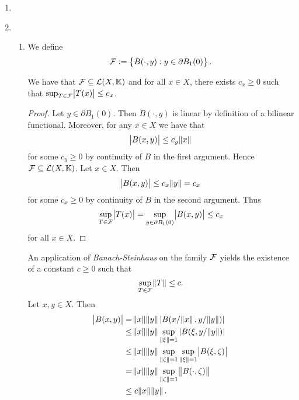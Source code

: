\begin{enumerate}[label = \textbf{Exercise \arabic*.},wide = 0pt, itemsep = 1.5ex]
	\item

	\item
		~
		\begin{enumerate}[label = \textbf{\alph*.},wide = 0pt, itemsep = 1.5ex]
			\item We define
				\begin{equation*}
					\Fcal := \cbr{B(\cdot,y) : y \in \partial B_1(0)}.
				\end{equation*}

				\begin{lemma}
					We have that $\mathcal{F} \subseteq \mathcal{L}(X,\mathbb{K})$ and for all $x \in X$, there exists $c_x \geq 0$ such that $\sup_{T \in \Fcal}\abs{T(x)} \leq c_x$.
				\end{lemma}

				\begin{proof}
					Let $y \in \partial B_1(0)$. Then $B(\cdot,y)$ is linear by definition of a bilinear functional. Moreover, for any $x \in X$ we have that
					\begin{equation*}
						\abs{B(x,y)} \leq c_y \norm{x}
					\end{equation*}
					\noindent for some $c_y \geq 0$ by continuity of $B$ in the first argument. Hence $\mathcal{F} \subseteq \mathcal{L}(X,\mathbb{K})$. Let $x \in X$. Then
					\begin{equation*}
						\abs{B(x,y)} \leq c_x \norm{y} = c_x
					\end{equation*}
					\noindent for some $c_x \geq 0$ by continuity of $B$ in the second argument. Thus
					\begin{equation*}
						\sup_{T \in \Fcal}\abs{T(x)} = \sup_{y \in \partial B_1(0)} \abs{B(x,y)} \leq c_x
					\end{equation*}
					\noindent for all $x \in X$.
				\end{proof}

				An application of \emph{Banach-Steinhaus} on the family $\mathcal{F}$ yields the existence of a constant $c \geq 0$ such that
				\begin{equation*}
					\sup_{T \in \Fcal}\norm{T} \leq c.
				\end{equation*}
				Let $x,y \in X$. Then
				\begin{align*}
					\abs{B(x,y)} &= \norm{x}\norm{y} \abs[0]{B(x/\norm{x},y/\norm{y})}\\
					&\leq \norm{x}\norm{y} \sup_{\norm[0]{\xi} = 1}\abs[0]{B(\xi,y/\norm{y})}\\
					&\leq \norm{x}\norm{y} \sup_{\norm[0]{\zeta} = 1} \sup_{\norm[0]{\xi} = 1} \abs{B(\xi,\zeta)}\\
					&= \norm{x}\norm{y} \sup_{\norm[0]{\zeta} = 1}\norm{B(\cdot,\zeta)}\\
					&\leq c\norm{x}\norm{y}.
				\end{align*}


\end{enumerate}
\end{enumerate}
